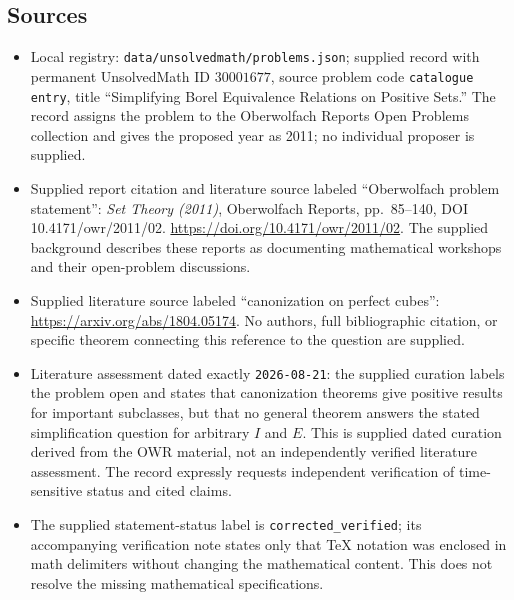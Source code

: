 \documentclass[11pt]{article}
\begin{document}
\subsection{Sources}
\begin{itemize}
\item Local registry: \texttt{data/unsolvedmath/problems.json}; supplied record with permanent UnsolvedMath ID \(30001677\), source problem code \texttt{catalogue entry}, title ``Simplifying Borel Equivalence Relations on Positive Sets.'' The record assigns the problem to the Oberwolfach Reports Open Problems collection and gives the proposed year as 2011; no individual proposer is supplied.
\item Supplied report citation and literature source labeled ``Oberwolfach problem statement'': \emph{Set Theory (2011)}, Oberwolfach Reports, pp.\ 85--140, DOI 10.4171/owr/2011/02. \url{https://doi.org/10.4171/owr/2011/02}. The supplied background describes these reports as documenting mathematical workshops and their open-problem discussions.
\item Supplied literature source labeled ``canonization on perfect cubes'': \url{https://arxiv.org/abs/1804.05174}. No authors, full bibliographic citation, or specific theorem connecting this reference to the question are supplied.
\item Literature assessment dated exactly \texttt{2026-08-21}: the supplied curation labels the problem open and states that canonization theorems give positive results for important subclasses, but that no general theorem answers the stated simplification question for arbitrary \(I\) and \(E\). This is supplied dated curation derived from the OWR material, not an independently verified literature assessment. The record expressly requests independent verification of time-sensitive status and cited claims.
\item The supplied statement-status label is \texttt{corrected\_verified}; its accompanying verification note states only that TeX notation was enclosed in math delimiters without changing the mathematical content. This does not resolve the missing mathematical specifications.
\end{itemize}
\end{document}
